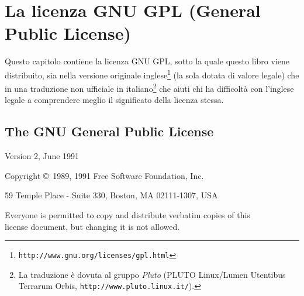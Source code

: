 
\chapter{La licenza GNU GPL (General Public License)}
\label{ch:licgpl}
Questo capitolo contiene la licenza GNU GPL, sotto la quale
questo libro viene distribuito, sia nella versione originale
inglese\footnote{\texttt{http://www.gnu.org/licenses/gpl.html}
} (la sola dotata di valore legale) che in una traduzione
non ufficiale in italiano\footnote{La traduzione \`e dovuta
  al gruppo \emph{Pluto} (PLUTO Linux/Lumen Utentibus
  Terrarum Orbis, \texttt{http://www.pluto.linux.it/}). }
che aiuti chi ha difficolt\`a con l'inglese legale a
comprendere meglio il significato della licenza stessa.

\section{The GNU General Public License}
\begin{center}
  \setlength{\parindent}{0in}
  Version 2, June 1991

  Copyright \copyright\ 1989, 1991 Free Software Foundation,
  Inc.

  \bigskip

  59 Temple Place - Suite 330, Boston, MA  02111-1307, USA

  \bigskip

  Everyone is permitted to copy and distribute verbatim
  copies of this \\
  license document, but changing it is not allowed.
\end{center}

